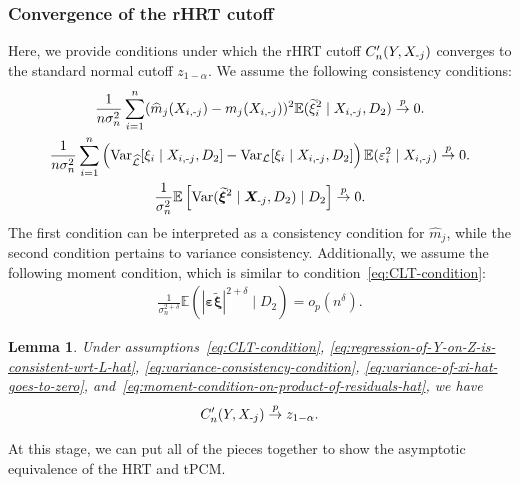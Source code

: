 \documentclass[12pt]{article}
\newtheorem{lemma}{Lemma}
\theoremstyle{definition}
\theoremstyle{remark}
\newcommand{\E}{\mathbb E}								%
\newcommand{\V}{\mathrm{Var}}							%
\newcommand{\prx}{\bm X}								%
\newcommand{\srx}{X}									%
\newcommand{\sry}{Y}									%
\newcommand{\peps}{\bm \varepsilon}						%
\newcommand{\seps}{\varepsilon}							%
\newcommand{\pxi}{\bm \xi}						%
\newcommand{\sxi}{\xi}							%
\newcommand{\law}{\mathcal L}							%
\newcommand{\lawhat}{\widehat{\mathcal L}}				%
\newcommand{\minus}{\textnormal{-}} 						    %
\begin{document}
\subsubsection{Convergence of the rHRT cutoff} \label{sec:convergence-of-rHRT-cutoff}

Here, we provide conditions under which the rHRT cutoff $C'_n(\sry,\srx_{\minus j})$ converges to the standard normal cutoff $z_{1-\alpha}$. We assume the following consistency conditions:
\begin{gather}
	\label{eq:regression-of-Y-on-Z-is-consistent-wrt-L-hat} \frac{1}{n \sigma^2_n} \sum_{i=1}^n(\widehat m_j(\srx_{i,\minus j})-m_j(\srx_{i,\minus j}))^2 \E( \widetilde\sxi^2_i \mid \srx_{i,\minus j},D_2)  \overset{p}{\to} 0.\\
	\label{eq:variance-consistency-condition}
	\frac{1}{n\sigma_n^2} \sum_{i=1}^n \left(\V_{\lawhat}[\sxi_i \mid \srx_{i,\minus j}, D_2] - \V_{\law}[\sxi_i \mid \srx_{i,\minus j}, D_2] \right)\E(\seps_i^2 \mid \srx_{i,\minus j}) \overset{p}{\to} 0.\\
	\label{eq:variance-of-xi-hat-goes-to-zero}\frac{1}{{\sigma_n^2}}\E\left[\V(\widetilde{\pxi}^2 \mid \prx_{\minus j}, D_2)\mid D_2\right] \overset{p}{\to} 0.
\end{gather}
The first condition can be interpreted as a consistency condition for $\widehat m_j$, while the second condition pertains to variance consistency. Additionally, we assume the following moment condition, which is similar to condition~\eqref{eq:CLT-condition}:
\begin{gather}
	\label{eq:moment-condition-on-product-of-residuals-hat} 
	\frac{1}{\sigma_n^{2+\delta}}\E( |\peps\widetilde{\pxi}|^{2+\delta} \mid D_2) = o_p(n^\delta).
\end{gather}

\begin{lemma}\label{thm:conditional-convergence-of-HRT-to-normality}
	Under assumptions~\eqref{eq:CLT-condition}, \eqref{eq:regression-of-Y-on-Z-is-consistent-wrt-L-hat}, \eqref{eq:variance-consistency-condition}, \eqref{eq:variance-of-xi-hat-goes-to-zero}, and~\eqref{eq:moment-condition-on-product-of-residuals-hat}, we have
	$$
	C'_n(\sry,\srx_{\minus j}) \overset{p}{\to} z_{1-\alpha}.
	$$
\end{lemma}

At this stage, we can put all of the pieces together to show the asymptotic equivalence of the HRT and tPCM.
\end{document}
